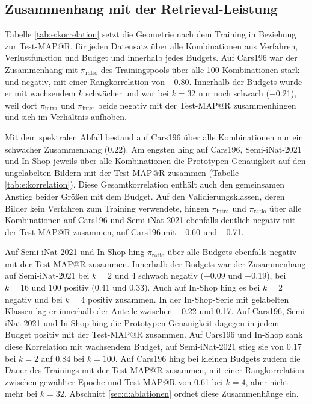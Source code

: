 \subsection{Zusammenhang mit der Retrieval-Leistung}

 Tabelle \ref{tab:e:korrelation} setzt die Geometrie nach dem Training in Beziehung zur Test-\ac{MAP@R}, für jeden Datensatz über alle Kombinationen aus Verfahren, Verlustfunktion und Budget und innerhalb jedes Budgets. Auf Cars196 war der Zusammenhang mit $\pi_{\mathrm{ratio}}$ des Trainingspools über alle 100 Kombinationen stark und negativ, mit einer Rangkorrelation von \num{-0.80}. Innerhalb der Budgets wurde er mit wachsendem $k$ schwächer und war bei $k=32$ nur noch schwach (\num{-0.21}), weil dort $\pi_{\mathrm{intra}}$ und $\pi_{\mathrm{inter}}$ beide negativ mit der Test-\ac{MAP@R} zusammenhingen und sich im Verhältnis aufhoben.



Mit dem spektralen Abfall bestand auf Cars196 über alle Kombinationen nur ein schwacher Zusammenhang (\num{0.22}). Am engsten hing auf Cars196, Semi-iNat-2021 und In-Shop jeweils über alle Kombinationen die Prototypen-Genauigkeit auf den ungelabelten Bildern mit der Test-\ac{MAP@R} zusammen (Tabelle \ref{tab:e:korrelation}). Diese Gesamtkorrelation enthält auch den gemeinsamen Anstieg beider Größen mit dem Budget. Auf den Validierungsklassen, deren Bilder kein Verfahren zum Training verwendete, hingen $\pi_{\mathrm{intra}}$ und $\pi_{\mathrm{ratio}}$ über alle Kombinationen auf Cars196 und Semi-iNat-2021 ebenfalls deutlich negativ mit der Test-\ac{MAP@R} zusammen, auf Cars196 mit \num{-0.60} und \num{-0.71}. 

Auf Semi-iNat-2021 und In-Shop hing $\pi_{\mathrm{ratio}}$ über alle Budgets ebenfalls negativ mit der Test-\ac{MAP@R} zusammen. Innerhalb der Budgets war der Zusammenhang auf Semi-iNat-2021 bei $k=2$ und 4 schwach negativ (\num{-0.09} und \num{-0.19}), bei $k=16$ und 100 positiv (\num{0.41} und \num{0.33}). Auch auf In-Shop hing es bei $k=2$ negativ und bei $k=4$ positiv zusammen. In der In-Shop-Serie mit gelabelten Klassen lag er innerhalb der Anteile zwischen \num{-0.22} und \num{0.17}. Auf Cars196, Semi-iNat-2021 und In-Shop hing die Prototypen-Genauigkeit dagegen in jedem Budget positiv mit der Test-\ac{MAP@R} zusammen. Auf Cars196 und In-Shop sank diese Korrelation mit wachsendem Budget, auf Semi-iNat-2021 stieg sie von \num{0.17} bei $k=2$ auf \num{0.84} bei $k=100$. Auf Cars196 hing bei kleinen Budgets zudem die Dauer des Trainings mit der Test-\ac{MAP@R} zusammen, mit einer Rangkorrelation zwischen gewählter Epoche und Test-\ac{MAP@R} von \num{0.61} bei $k=4$, aber nicht mehr bei $k=32$. Abschnitt \ref{sec:d:ablationen} ordnet diese Zusammenhänge ein.

